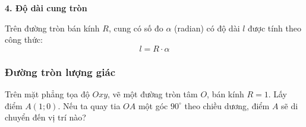 \begin{kienthuc}
\textbf{4. Độ dài cung tròn}

Trên đường tròn bán kính $R$, cung có số đo $\alpha$ (radian) có độ dài $l$ được tính theo công thức:
$$l = R \cdot \alpha$$
\end{kienthuc}

\subsubsection{Đường tròn lượng giác}

\begin{hoatdong}
Trên mặt phẳng tọa độ $Oxy$, vẽ một đường tròn tâm $O$, bán kính $R=1$. Lấy điểm $A(1;0)$. Nếu ta quay tia $OA$ một góc $90^\circ$ theo chiều dương, điểm $A$ sẽ di chuyển đến vị trí nào?
\end{hoatdong}


